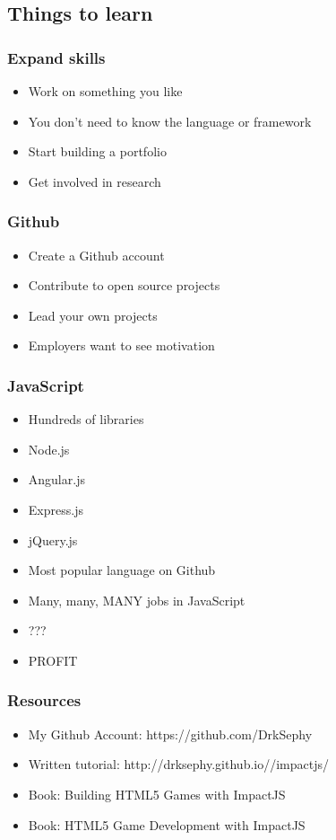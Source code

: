 \documentclass[red]{beamer}
\begin{document}
\subsection{Things to learn}
\begin{frame}
    \frametitle{Expand skills}
    \begin{itemize}
    \item<1-> Work on something you like
    \item<2-> You don't need to know the language or framework
    \item<3-> Start building a portfolio
    \item<4-> Get involved in research
    \end{itemize}
\end{frame}

\begin{frame}
    \frametitle{Github}
    \begin{itemize}
    \item<1-> Create a Github account
    \item<2-> Contribute to open source projects
    \item<3-> Lead your own projects
    \item<4-> Employers want to see motivation
    \end{itemize}
\end{frame}

\begin{frame}
    \frametitle{JavaScript}
    \begin{itemize}
    \item<1-> Hundreds of libraries 
    \item<2-> Node.js
    \item<3-> Angular.js
    \item<4-> Express.js
    \item<5-> jQuery.js
    \item<6-> Most popular language on Github
    \item<7-> Many, many, MANY jobs in JavaScript
    \item<8-> ???
    \item<9-> PROFIT
    \end{itemize}
\end{frame}

\begin{frame}
    \frametitle{Resources}
    \begin{itemize}
    \item<1-> My Github Account: https://github.com/DrkSephy
    \item<2-> Written tutorial: http://drksephy.github.io//impactjs/
    \item<3-> Book: Building HTML5 Games with ImpactJS
    \item<4-> Book: HTML5 Game Development with ImpactJS
    \end{itemize}
\end{frame}
\end{document}
